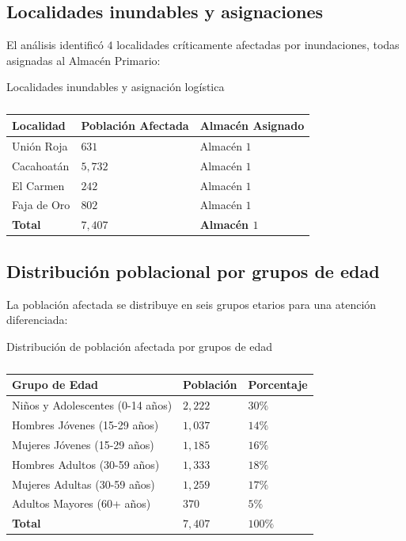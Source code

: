 \documentclass[
  spanish,
  us-letterpaper,
  DIV=11,
  numbers=noendperiod]{scrreprt}
\numberwithin{equation}{section}
\begin{document}
\subsection{Localidades inundables y
asignaciones}\label{localidades-inundables-y-asignaciones}

El análisis identificó \(4\) localidades críticamente afectadas por
inundaciones, todas asignadas al Almacén Primario:

Localidades inundables y asignación logística

\begin{longtable}[]{@{}lll@{}}

\caption{\label{tbl-localidades-inundables}}

\tabularnewline

\toprule\noalign{}
Localidad & Población Afectada & Almacén Asignado \\
\midrule\noalign{}
\endhead
\bottomrule\noalign{}
\endlastfoot
Unión Roja & \(631\) & Almacén \(1\) \\
Cacahoatán & \(5,732\) & Almacén \(1\) \\
El Carmen & \(242\) & Almacén \(1\) \\
Faja de Oro & \(802\) & Almacén \(1\) \\
\textbf{Total} & \textbf{\(7,407\)} & \textbf{Almacén \(1\)} \\

\end{longtable}

\subsection{Distribución poblacional por grupos de
edad}\label{distribuciuxf3n-poblacional-por-grupos-de-edad}

La población afectada se distribuye en seis grupos etarios para una
atención diferenciada:

Distribución de población afectada por grupos de edad

\begin{longtable}[]{@{}lll@{}}

\caption{\label{tbl-poblacion-edad}}

\tabularnewline

\toprule\noalign{}
Grupo de Edad & Población & Porcentaje \\
\midrule\noalign{}
\endhead
\bottomrule\noalign{}
\endlastfoot
Niños y Adolescentes (0-14 años) & \(2,222\) & \(30\%\) \\
Hombres Jóvenes (15-29 años) & \(1,037\) & \(14\%\) \\
Mujeres Jóvenes (15-29 años) & \(1,185\) & \(16\%\) \\
Hombres Adultos (30-59 años) & \(1,333\) & \(18\%\) \\
Mujeres Adultas (30-59 años) & \(1,259\) & \(17\%\) \\
Adultos Mayores (60+ años) & \(370\) & \(5\%\) \\
\textbf{Total} & \textbf{\(7,407\)} & \textbf{\(100\%\)} \\

\end{longtable}
\end{document}
